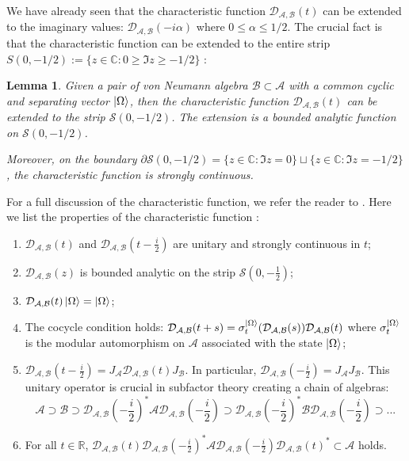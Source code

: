 \documentclass[a4paper,11pt]{article}
\newtheorem{lemma}[theorem]{Lemma}
\theoremstyle{definition}
\begin{document}
We have already seen that the characteristic function $\mathcal{D}_{\mathcal{A}, \mathcal{B}}(t)$ can be extended to the imaginary values: $\mathcal{D}_{\mathcal{A}, \mathcal{B}}(-i\alpha)$ where $0\leq \alpha\leq 1/2$. The crucial fact is that the characteristic function can be extended to the entire strip $S(0, -1/2) := \{z\in\mathbb{C}: 0\geq \Im{z}\geq -1/2\}$ \cite{revolutionizing}:
\begin{lemma}\label{lemma:characteristic}
    Given a pair of von Neumann algebra $\mathcal{B}\subset\mathcal{A}$ with a common cyclic and separating vector $\ket{\Omega}$, then the characteristic function $\mathcal{D}_{\mathcal{A}, \mathcal{B}}(t)$ can be extended to the strip $\mathcal{S}(0, -1/2)$. The extension is a bounded analytic function on $\mathcal{S}(0,-1/2)$.

    Moreover, on the boundary $\partial\mathcal{S}(0,-1/2) = \{z\in\mathbb{C}:\Im{z} = 0\}\sqcup\{z\in\mathbb{C}:\Im{z} = -1/2\}$, the characteristic function is strongly continuous.
\end{lemma}
For a full discussion of the characteristic function, we refer the reader to \cite{revolutionizing}. Here we list the properties of the characteristic function \cite{revolutionizing}:
\begin{enumerate}
    \item $\mathcal{D}_{\mathcal{A},\mathcal{B}}(t)$ and $\mathcal{D}_{\mathcal{A}, \mathcal{B}}(t - \frac{i}{2})$ are unitary and strongly continuous in $t$;
    \item $\mathcal{D}_{\mathcal{A},\mathcal{B}}(z)$ is bounded analytic on the strip $\mathcal{S}(0,-\frac{1}{2})$;
    \item $\mathcal{D}_{\mathcal{A},\mathcal{B}}(t)\ket{\Omega} = \ket{\Omega}$;
    \item The cocycle condition holds: $\mathcal{D}_{\mathcal{A},\mathcal{B}}(t+s) = \sigma_t^{\ket{\Omega}}(\mathcal{D}_{\mathcal{A},\mathcal{B}}(s))\mathcal{D}_{\mathcal{A},\mathcal{B}}(t)$ where $\sigma_t^{\ket{\Omega}}$ is the modular automorphism on $\mathcal{A}$ associated with the state $\ket{\Omega}$;
    \item $\mathcal{D}_{\mathcal{A},\mathcal{B}}(t - \frac{i}{2}) = J_\mathcal{A}\mathcal{D}_{\mathcal{A},\mathcal{B}}(t)J_\mathcal{B}$. In particular, $\mathcal{D}_{\mathcal{A},\mathcal{B}}(-\frac{i}{2}) = J_\mathcal{A}J_\mathcal{B}$. This unitary operator is crucial in subfactor theory creating a chain of algebras:
    \begin{equation}
        \mathcal{A}\supset\mathcal{B}\supset\mathcal{D}_{\mathcal{A},\mathcal{B}}(-\frac{i}{2})^*\mathcal{A}\mathcal{D}_{\mathcal{A},\mathcal{B}}(-\frac{i}{2})\supset\mathcal{D}_{\mathcal{A},\mathcal{B}}(-\frac{i}{2})^*\mathcal{B}\mathcal{D}_{\mathcal{A},\mathcal{B}}(-\frac{i}{2})\supset...
    \end{equation}
    \item For all $t\in\mathbb{R}$, $\mathcal{D}_{\mathcal{A},\mathcal{B}}(t)\mathcal{D}_{\mathcal{A},\mathcal{B}}(-\frac{i}{2})^*\mathcal{A}\mathcal{D}_{\mathcal{A},\mathcal{B}}(-\frac{i}{2})\mathcal{D}_{\mathcal{A},\mathcal{B}}(t)^*\subset\mathcal{A}$ holds.
\end{enumerate}
\end{document}
